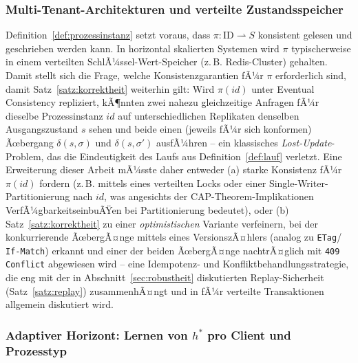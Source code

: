 ﻿\documentclass[a4paper,12pt]{article}
\theoremstyle{definition}
\begin{document}
\subsubsection{Multi-Tenant-Architekturen und verteilte Zustandsspeicher}

Definition~\ref{def:prozessinstanz} setzt voraus, dass $\pi: \text{ID}\rightharpoonup S$
konsistent gelesen und geschrieben werden kann. In horizontal skalierten Systemen wird
$\pi$ typischerweise in einem verteilten SchlÃ¼ssel-Wert-Speicher (z.\,B. Redis-Cluster)
gehalten. Damit stellt sich die Frage, welche Konsistenzgarantien fÃ¼r $\pi$ erforderlich
sind, damit Satz~\ref{satz:korrektheit} weiterhin gilt: Wird $\pi(id)$ unter
Eventual Consistency repliziert, kÃ¶nnten zwei nahezu gleichzeitige Anfragen fÃ¼r dieselbe
Prozessinstanz $id$ auf unterschiedlichen Replikaten denselben Ausgangszustand $s$ sehen
und beide einen (jeweils fÃ¼r sich konformen) Ãœbergang $\delta(s,\sigma)$ und
$\delta(s,\sigma')$ ausfÃ¼hren -- ein klassisches \emph{Lost-Update}-Problem, das die
Eindeutigkeit des Laufs aus Definition~\ref{def:lauf} verletzt. Eine Erweiterung dieser
Arbeit mÃ¼sste daher entweder (a) starke Konsistenz fÃ¼r $\pi(id)$ fordern (z.\,B. mittels
eines verteilten Locks oder einer Single-Writer-Partitionierung nach $id$, was angesichts
der CAP-Theorem-Implikationen VerfÃ¼gbarkeitseinbuÃŸen bei Partitionierung bedeutet), oder
(b) Satz~\ref{satz:korrektheit} zu einer \emph{optimistischen} Variante verfeinern, bei
der konkurrierende ÃœbergÃ¤nge mittels eines VersionszÃ¤hlers (analog zu \texttt{ETag}/
\texttt{If-Match}) erkannt und einer der beiden ÃœbergÃ¤nge nachtrÃ¤glich mit
\texttt{409 Conflict} abgewiesen wird -- eine Idempotenz- und
Konfliktbehandlungsstrategie, die eng mit der in Abschnitt~\ref{sec:robustheit}
diskutierten Replay-Sicherheit (Satz~\ref{satz:replay}) zusammenhÃ¤ngt und in
\cite{helland2007} fÃ¼r verteilte Transaktionen allgemein diskutiert wird.

\subsubsection{Adaptiver Horizont: Lernen von $h^\ast$ pro Client und Prozesstyp}
\end{document}
